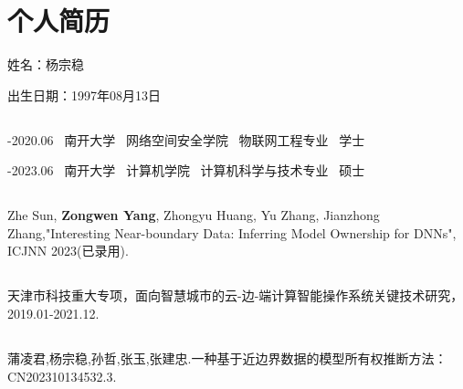 
\chapter*{个人简历}


\noindent 姓名：杨宗稳

\noindent 出生日期：1997年08月13日

\section*{}

-2020.06 \quad\ 南开大学 \quad\ 网络空间安全学院 \quad\ 物联网工程专业 \quad\ 学士

-2023.06 \quad\ 南开大学 \quad\ 计算机学院 \quad\ 计算机科学与技术专业 \quad\ 硕士

\section*{}

\noindent Zhe Sun, \textbf{Zongwen Yang}, Zhongyu Huang, Yu Zhang, Jianzhong Zhang,"Interesting Near-boundary Data: Inferring Model Ownership for DNNs", ICJNN 2023(已录用).

\section*{}

\noindent 天津市科技重大专项，面向智慧城市的云-边-端计算智能操作系统关键技术研究，2019.01-2021.12.

\section*{}

\noindent 蒲凌君,杨宗稳,孙哲,张玉,张建忠.一种基于近边界数据的模型所有权推断方法：CN202310134532.3.


%




